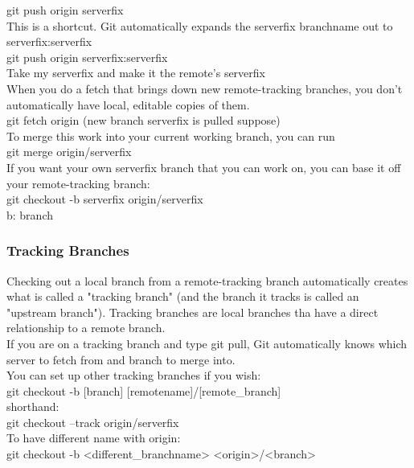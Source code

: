 \documentclass[11pt]{article}
\begin{document}
git push origin serverfix\\
This is a shortcut. Git automatically expands the serverfix branchname out to\\
serverfix:serverfix\\

git push origin serverfix:serverfix\\
Take my serverfix and make it the remote's serverfix\\

When you do a fetch that brings down new remote-tracking branches, you don't automatically have local, editable copies of them.\\

git fetch origin (new branch serverfix is pulled suppose)\\
To merge this work into your current working branch, you can run\\
git merge origin/serverfix\\

If you want your own serverfix branch that you can work on, you can base it off your remote-tracking branch:\\
git checkout -b serverfix origin/serverfix\\
b: branch\\

\subsubsection{Tracking Branches}
\label{sec:orgcc90530}
Checking out a local branch from a remote-tracking branch automatically creates what is called a "tracking branch" (and the branch it tracks is called an "upstream branch"). Tracking branches are local branches tha have a direct relationship to a remote branch.\\

If you are on a tracking branch and type git pull, Git automatically knows which server to fetch from and branch to merge into.\\

You can set up other tracking branches if you wish:\\
git checkout -b [branch] [remotename]/[remote\_branch]\\
shorthand:\\
git checkout --track origin/serverfix\\

To have different name with origin:\\
git checkout -b <different\_branchname> <origin>/<branch>\\
\end{document}
